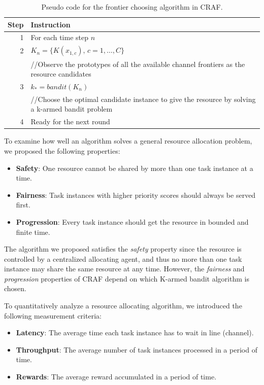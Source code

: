 \documentclass[conference]{IEEEtran}
\begin{document}
\begin{table}[h]
	\begin{tabular}{r | p{7.5cm}}
		Step & Instruction\\
		\hline
		\hline
		1 & For each time step $n$\\
		\hline
		2 & $K_n = \{K(x_{1,c}),\,c=1,\dots,C\}$\\
		  & //Observe the prototypes of all the available channel frontiers as the resource candidates\\
		\hline
		3 & $k_* = bandit(K_n)$\\
		  & //Choose the optimal candidate instance to give the resource by solving a k-armed bandit problem \\
		\hline
		4 & Ready for the next round\\
	\end{tabular}
	\caption{Pseudo code for the frontier choosing algorithm in CRAF. }
	\label{pseudo_code}
\end{table}

%
%
%
%

To examine how well an algorithm solves a general resource allocation problem, we proposed the following properties:

\begin{itemize}
\item \textbf{Safety}: One resource cannot be shared by more than one task instance at a time.
\item \textbf{Fairness}: Task instances with higher priority scores should always be served first. 
\item \textbf{Progression}: Every task instance should get the resource in bounded and finite time.
\end{itemize}

The algorithm we proposed satisfies the \emph{safety} property since the resource is controlled by a centralized allocating agent, and thus no more than one task instance may share the same resource at any time. However, the \emph{fairness} and \emph{progression} properties of CRAF depend on which K-armed bandit algorithm is chosen.

To quantitatively analyze a resource allocating algorithm, we introduced the following measurement criteria:
\begin{itemize}
\item \textbf{Latency}: The average time each task instance has to wait in line (channel).
\item \textbf{Throughput}: The average number of task instances processed in a period of time.
\item \textbf{Rewards}: The average reward accumulated in a period of time.
\end{itemize}
\end{document}
